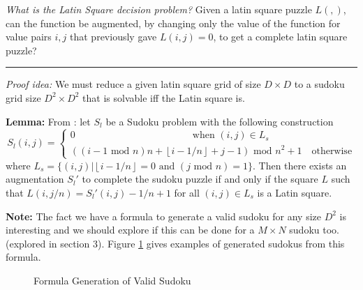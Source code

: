 \documentclass[a4paper,11pt]{report}
\newcounter{row}
\newcounter{col}
\newcounter{rowa}
\newcounter{cola}
\newcommand\setrow[9]{
  \setcounter{col}{1}
  \foreach \n in {#1, #2, #3, #4, #5, #6, #7, #8, #9} {
    \edef\x{\value{col} - 0.5}
    \edef\y{9.5 - \value{row}}
    \node[anchor=center] at (\x, \y) {\n};
    \stepcounter{col}
  }
  \stepcounter{row}
}
\newcommand\setrowa[4]{
  \setcounter{cola}{1}
  \foreach \n in {#1, #2, #3, #4} {
    \edef\x{\value{cola} - 0.5}
    \edef\y{4.5 - \value{rowa}}
    \node[anchor=center] at (\x, \y) {\n};
    \stepcounter{cola}
  }
  \stepcounter{rowa}
}
\begin{document}
\textit{What is the Latin Square decision problem?} Given a latin square puzzle $L(,)$, can the function be augmented, by changing only the value of the function for value pairs $i,j$ that previously gave $L(i,j) =0$, to get a complete latin square puzzle?

\noindent\rule{4cm}{0.4pt}

\textit{Proof idea:} We must reduce a given latin square grid of size $D \times D$ to a sudoku grid size $D^2 \times D^2$ that is solvable iff the Latin square is.

\textbf{Lemma:} From \cite{sls}: let $S_l$ be a Sudoku problem with the following construction 
\begin{equation}
	S_l(i,j) =\begin{cases}
0 \qquad\qquad\qquad\qquad\qquad\qquad\text{when } (i,j) \in L_s \\ 
((i-1 \text{ mod } n)n + \left\lfloor{i-1/n}\right\rfloor+j-1)\text{ mod } n^2 +1 \quad\text{otherwise}
\end{cases}
\end{equation}
where $L_s=\{(i,j)| \left\lfloor{i-1/n}\right\rfloor=0 \text{ and }(j \text{ mod }n)=1\}$. Then there exists an augmentation $S_l'$ to complete the sudoku puzzle if and only if the square $L$ such that $L(i,j/n)=S_l'(i,j)-1/n+1$ for all $(i,j) \in L_s$ is a Latin square.

\textbf{Note:} The fact we have a formula to generate a valid sudoku for any size $D^2$ is interesting and we should explore if this can be done for a $M\times N$ sudoku too. (explored in section 3). Figure \ref{formula} gives examples of generated sudokus from this formula.

\begin{figure}[h]
\centering
{}
\caption{Formula Generation of Valid Sudoku}
\label{formula}
\end{figure}
\end{document}
